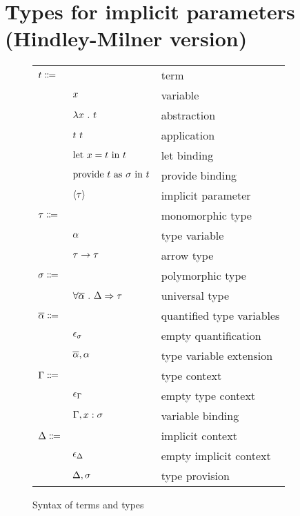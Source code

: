 \documentclass[acmlarge]{acmart}
\begin{document}
\section{Types for implicit parameters (Hindley-Milner version)}

  \begin{figure}
    \begin{mdframed}

      \begin{tabular}{l l l}
        $t \Coloneqq $ & & term \\
        & $x$ & variable \\
        & $\lambda x \ . \ t$ & abstraction \\
        & $t \ t$ & application \\
        & $\text{let } x = t \text{ in } t$ & let binding \\
        & $\text{provide } t \text{ as } \sigma \text{ in } t$ & provide binding \\
        & $\left\langle \tau \right\rangle$ & implicit parameter \\
        $\tau \Coloneqq$ & & monomorphic type \\
        & $\alpha$ & type variable \\
        & $\tau \rightarrow \tau$ & arrow type \\
        $\sigma \Coloneqq$ & & polymorphic type \\
        & $\forall \overline{\alpha} \ . \ \Delta \Rightarrow \tau$ & universal type \\
        $\overline{\alpha} \Coloneqq$ & & quantified type variables \\
        & $\epsilon_{\sigma}$ & empty quantification \\
        & $\overline{\alpha}, {\alpha}$ & type variable extension \\
        $\Gamma \Coloneqq$ & & type context \\
        & $\epsilon_{\Gamma}$ & empty type context \\
        & $\Gamma, x : \sigma$ & variable binding \\
        $\Delta \Coloneqq$ & & implicit context \\
        & $\epsilon_{\Delta}$ & empty implicit context \\
        & $\Delta, \sigma$ & type provision
      \end{tabular}

      \caption{Syntax of terms and types}
      \label{fig:types_syntax}

    \end{mdframed}
  \end{figure}
\end{document}
